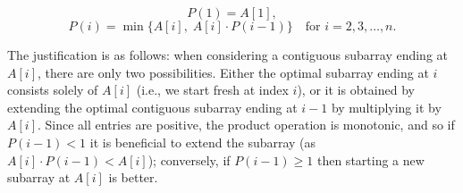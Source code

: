 \documentclass[12pt, letterpaper]{article}
\theoremstyle{definition}
\begin{document}
\begin{enumerate}[(a)]
\begin{enumerate}[(i)]
        \[
        P(1) = A[1],
        \]
        \[
        P(i) = \min\{A[i],\; A[i] \cdot P(i-1)\} \quad \text{for } i=2,3,\dots,n.
        \]
        
        The justification is as follows: when considering a contiguous subarray ending at \(A[i]\), there are only two possibilities. Either the optimal subarray ending at \(i\) consists solely of \(A[i]\) (i.e., we start fresh at index \(i\)), or it is obtained by extending the optimal contiguous subarray ending at \(i-1\) by multiplying it by \(A[i]\). Since all entries are positive, the product operation is monotonic, and so if \(P(i-1) < 1\) it is beneficial to extend the subarray (as \(A[i] \cdot P(i-1) < A[i]\)); conversely, if \(P(i-1) \ge 1\) then starting a new subarray at \(A[i]\) is better.
    \end{enumerate}  
\end{enumerate}
\end{document}
